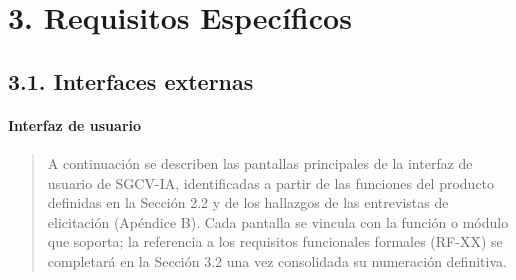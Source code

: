 \documentclass[
]{article}
\begin{document}
\section{3. Requisitos Específicos}\label{requisitos-especuxedficos}

\subsection{3.1. Interfaces externas}\label{interfaces-externas}

\paragraph{Interfaz de usuario}\label{interfaz-de-usuario}

\begin{quote}
A continuación se describen las pantallas principales de la interfaz de
usuario de SGCV-IA, identificadas a partir de las funciones del producto
definidas en la Sección 2.2 y de los hallazgos de las entrevistas de
elicitación (Apéndice B). Cada pantalla se vincula con la función o
módulo que soporta; la referencia a los requisitos funcionales formales
(RF-XX) se completará en la Sección 3.2 una vez consolidada su
numeración definitiva.
\end{quote}
\end{document}
